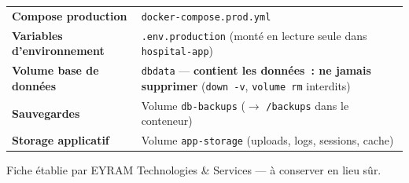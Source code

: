 \documentclass[11pt,a4paper]{article}
\newcommand{\fiche}[2]{%
  \par\smallskip
  \begin{tabularx}{\textwidth}{|>{\raggedright\arraybackslash}p{5.4cm}|>{\raggedright\arraybackslash}X|}
  \hline
  \rowcolor{headbg}\multicolumn{2}{|l|}{\textbf{\textcolor{white}{#1}}}\\\hline
  #2
  \hline
  \end{tabularx}\par\smallskip
}
\newcommand{\code}[1]{\texttt{#1}}
\begin{document}
\fiche{Emplacements \& volumes utiles}{
  \textbf{Compose production} & \code{docker-compose.prod.yml} \\\hline
  \textbf{Variables d'environnement} & \code{.env.production} (monté en lecture seule dans \code{hospital-app}) \\\hline
  \textbf{Volume base de données} & \code{dbdata} — \textbf{\textcolor{danger}{contient les données~: ne jamais supprimer}} (\code{down -v}, \code{volume rm} interdits) \\\hline
  \textbf{Sauvegardes} & Volume \code{db-backups} ($\rightarrow$ \code{/backups} dans le conteneur) \\\hline
  \textbf{Storage applicatif} & Volume \code{app-storage} (uploads, logs, sessions, cache) \\
}

\vfill
\begin{center}\small\color{greytext}
Fiche établie par EYRAM Technologies \& Services — à conserver en lieu sûr.
\end{center}
\end{document}
